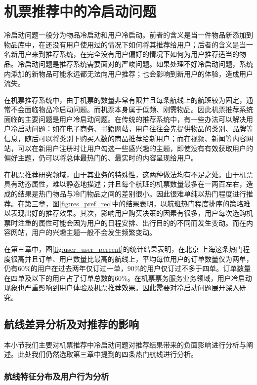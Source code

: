 
\chapter{机票推荐中的冷启动问题}
\label{chap:cold}

冷启动问题一般分为物品冷启动和用户冷启动。前者的含义是当一件物品新添加到物品库中，在还没有用户使用过的情况下如何将其推荐给用户；后者的含义是当一名新用户来到推荐系统，在完全没有用户偏好的情况下如何为用户推荐适当的物品。冷启动问题是推荐系统需要面对的严峻问题。如果处理不好冷启动问题，系统内添加的新物品可能永远都无法向用户推荐；也会影响到新用户的体验，造成用户流失。

在机票推荐系统中，由于机票的数量非常有限并且每条航线上的航班较为固定，通常不会面临物品冷启动问题。而机票本身属于低频、刚需物品。因此机票推荐系统面临的主要问题是用户冷启动问题。在传统的推荐系统中，有一些办法可以解决用户冷启动问题：如在电子商务、书籍网站，用户往往会先提供物品的类别、品牌等信息，随后可以将类别下购买人数的商品推荐给新用户；而在视频、新闻等内容网站，可以在新用户注册时让用户勾选一些感兴趣的主题，即使没有有效获取用户的偏好主题，仍可以将总体最热门的、最实时的内容呈现给用户。

在机票推荐研究领域，由于其业务的特殊性，这两种做法均有不足之处。由于机票具有动态属性，难以静态地描述；并且每个航班的机票数量最多在一两百左右，造成的结果是热门物品与冷门物品之间的差别很小。因此很难单纯以热门程度进行推荐。在第三章，图\ref{fig:res_pref_rec}中的结果表明，以航班热门程度排序的策略难以表现出好的推荐效果。其次，影响用户购买决策的因素有很多，用户每次选购机票时注重的属性可能会因为用户的日程安排、出行目的的不同而发生变动。而在内容网站，用户的兴趣主题一般不会发生频繁变动。

在第三章中，图\ref{fig:user_user_percent}的统计结果表明，在北京-上海这条热门程度很高并且订单、用户数量比最高的航线上，平均每位用户的订单数量仅为两单，仍有$60\%$的用户在过去两年仅订过一单，$90\%$的用户仅订过不多于四单。订单数量在四单及以下的用户占了订单总数的$60\%$。在机票票务服务业务领域，用户冷启动现象也严重影响到用户体验及机票推荐效果。因此需要对冷启动问题展开深入研究。


\section{航线差异分析及对推荐的影响}
本小节我们主要对机票推荐中冷启动问题对推荐结果带来的负面影响进行分析与阐述。此处我们仍然选取第三章中提到的四条热门航线进行分析。

\subsection{航线特征分布及用户行为分析}

